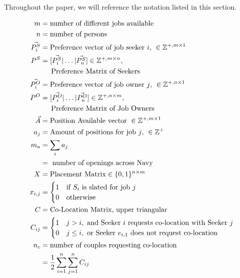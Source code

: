 
Throughout the paper, we will reference the notation listed in this section.

\begin{align}
m &= \text{number of different jobs available}\\
n &= \text{number of persons}\\
\vec{P^S_i} &= \text{Preference vector of job seeker $i$, } \in \mathbb{Z}^{+, m \times 1} \\
P^S &= [\vec{P^S_i} | \dots | \vec{P^S_n}] \in \mathbb{Z}^{+, m \times n}, \\ 
&\text{\indent Preference Matrix of Seekers} \\
\vec{P^O_i} &= \text{Preference vector of job owner $j$, } \in \mathbb{Z}^{+, n \times 1} \\
P^O &= [\vec{P^O_i} | \dots | \vec{P^O_n}] \in \mathbb{Z}^{+, n \times m}, \\ 
&\text{\indent Preference Matrix of Job Owners} \\
\vec{A} &= \text{Position Available vector }\in \mathbb{Z}^{+, m \times 1} \\
a_j &= \text{Amount of positions for job $j$, } \in \mathbb{Z}^{+} \\
m_a &= \sum_i a_j \\
&= \text{ number of openings across Navy}\\
X &= \text{Placement Matrix} \in \{0,1\}^{n \times m} \\
x_{i,j} &= \begin{cases}
1 & \text{if $S_i$ is slated for job $j$}\\
0 & \text{otherwise}
\end{cases} \\
C &= \text{Co-Location Matrix, upper triangular}\\
C_{ij} &= \begin{cases}
1 & j > i, \text{ and  Seeker $i$ requests co-location with Seeker $j$} \\
0 & j\leq i, \text{ or Seeker $e_{i,1}$ does not request co-location}
\end{cases} \\
n_c &= \text{number of couples requesting co-location}\\
&= \frac{1}{2}\sum_{i=1}^n\sum_{j=1}^n C_{ij}\\
\end{align}

